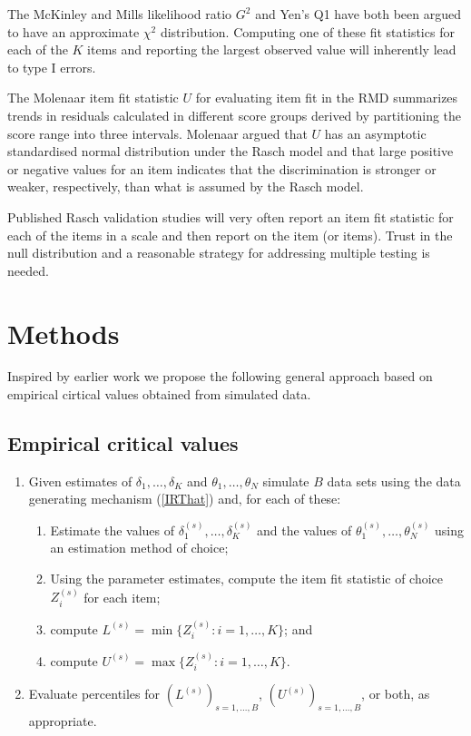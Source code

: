\documentclass[11pt,a4paper]{article}
\begin{document}
The McKinley and Mills \citeyear{McKinley-Mills-1985} likelihood ratio $G^2$ and Yen's \citeyear{Yen-1981} Q1 have both been argued to have an approximate $\chi^2$ distribution. Computing one of these fit statistics for each of the $K$ items and reporting the largest observed value will inherently lead to type I errors. 

The Molenaar \citeyear{Molenaar-1983} item fit statistic $U$ for evaluating item fit in the RMD summarizes trends in residuals calculated in different score groups derived by partitioning the score range into three intervals. Molenaar argued that $U$ has an asymptotic standardised normal distribution under the Rasch model and that large positive or negative values for an item indicates that the discrimination is stronger or weaker, respectively, than what is assumed by the Rasch model.

Published Rasch validation studies will very often report an item fit statistic for each of the items in a scale and then report on the item (or items). Trust in the null distribution and a reasonable strategy for addressing multiple testing is needed. 

\section{Methods}

Inspired by earlier work \cite{Stone-2000,Su-Sheu-Wang-et-al-2007,Wolfe-2008,Hodge-Morgan-2017} we propose the following general approach based on empirical cirtical values obtained from simulated data.

\subsection{Empirical critical values}

\begin{enumerate}
\item Given estimates of $\delta_1,\ldots,\delta_K$ and $\theta_1,\ldots,\theta_N$ simulate $B$ data sets using the data generating mechanism (\ref{IRThat}) and, for each of these:
\begin{enumerate}
\item Estimate the values of $\delta_1^{(s)},\ldots,\delta_K^{(s)}$ and the values of $\theta_1^{(s)},\ldots,\theta_N^{(s)}$ using an estimation method of choice;
\item Using the parameter estimates, compute the item fit statistic of choice $Z_i^{(s)}$ for each item;
\item compute $L^{(s)}=\min\{Z_i^{(s)}:i=1,\ldots,K\}$; and
\item compute $U^{(s)}=\max\{Z_i^{(s)}:i=1,\ldots,K\}$.
\end{enumerate}
\item Evaluate percentiles for $(L^{(s)})_{s=1,\ldots,B}$, $(U^{(s)})_{s=1,\ldots,B}$, or both, as appropriate.
\end{enumerate}
\end{document}

